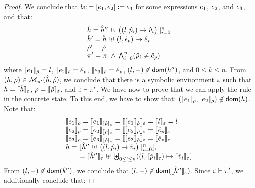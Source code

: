 \begin{proof}
\noindent{}
We conclude that  $\bcmd = [\jsilexpr_1, \jsilexpr_2] := \jsilexpr_3$ for some expressions $\jsilexpr_1$, $\jsilexpr_2$, 
and $\jsilexpr_3$, and that: 
$$
\begin{array}{l}
  \sheap =   \sheap'' \, \uplus \, \big((l, \sexprp_i) \mapsto \sexprv_i\big)\mid_{i = 0}^n     \\
  \sheap' =  \sheap \, \uplus \,  (l, \sexpr_p) \mapsto \sexpr_v  \\
  \sstore' = \sstore \\ 
    \pc' = \pc \ \wedge \, \bigwedge_{i = 0}^n (\sexprp_i \neq \sexpr_p)
\end{array}
$$ 
where $\symbeval{\jsilexpr_1}{\sstore} =  \loc$, $\symbeval{\jsilexpr_2}{\sstore} =  \sexpr_p$, 
$\symbeval{\jsilexpr_3}{\sstore} =  \sexpr_v$,  $(\loc, -) \not\in \domain(\sheap'')$, 
and $0 \leq k \leq n$. 
From $(\heap, \store) \in \smodels{\sheap, \sstore}{\pc'}$, we conclude that there is a symbolic environment
$\senv$ such that $\heap = \semexpr{\sheap}{\senv}$, $\store = \semexpr{\sstore}{\senv}$, and 
$\senv \vdash \pc'$. 
We have now to prove that we can apply the  rule in the concrete state.
To this end, we have to show that:
$(\symbeval{\jsilexpr_1}{\store}, \symbeval{\jsilexpr_2}{\store}) \not\in \domain(\heap)$. 
Note that: 
$$
\begin{array}{l}
%
 \symbeval{\jsilexpr_1}{\store} = \symbeval{\jsilexpr_1}{\symbeval{\sstore}{\senv}} = \symbeval{\symbeval{\jsilexpr_1}{\sstore}}{\senv} 
    = \symbeval{\loc}{\senv} = \loc \\ 
  \symbeval{\jsilexpr_2}{\store}  = \symbeval{\jsilexpr_2}{\semexpr{\sstore}{\senv}} =  \symbeval{\symbeval{\jsilexpr_2}{\sstore}}{\senv}
   =  \symbeval{\sexpr_p}{\senv} \\
  \symbeval{\jsilexpr_3}{\store}  = \symbeval{\jsilexpr_3}{\semexpr{\sstore}{\senv}} =  \symbeval{\symbeval{\jsilexpr_3}{\sstore}}{\senv}
   =  \symbeval{\sexpr_v}{\senv} \\
 \heap = \semexpr{\sheap'' \, \uplus \, \big((l, \sexprp_i) \mapsto \sexprv_i\big)\mid_{i = 0}^n}{\senv} \\
    \qquad = \semexpr{\sheap''}{\senv} \dunion \biguplus_{0 \leq i \leq n} ((l, \symbeval{\sexprp_i}{\senv}) \mapsto \symbeval{\sexprv_i}{\senv})
\end{array}
$$
From  $(\loc, -) \not\in \domain(\sheap'')$, we conclude that $(\loc, -) \not\in \domain(\semexpr{\sheap''}{\senv})$. 
Since $\senv \vdash \pc'$, we additionally conclude that: 

\end{proof}
